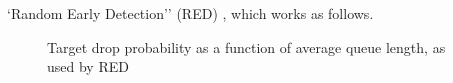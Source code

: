 %
%
%
%
`Random Early Detection'' (RED)
\cite{braden-98-a}, which works as follows.
\begin{figure}
  \caption{Target drop probability as a function of average queue length, as used by RED}\label{d32-red-1}
\end{figure}

